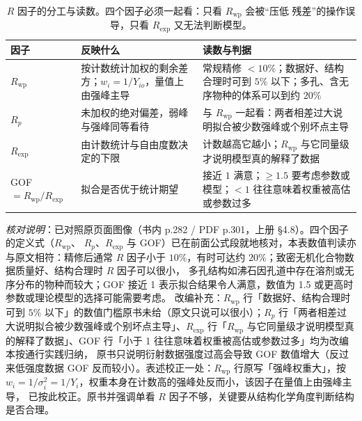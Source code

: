 \begin{table}[tbp]
  \centering
  \caption{$R$ 因子的分工与读数。四个因子必须一起看：只看 $R_{\mathrm{wp}}$ 会被``压低
    残差''的操作误导，只看 $R_{\mathrm{exp}}$ 又无法判断模型。}
  \label{tab:ch04c-rfactor}
  \begin{tabular}{@{}p{20mm}p{52mm}p{66mm}@{}}
    \toprule
    因子 & 反映什么 & 读数与判据 \\
    \midrule
    $R_{\mathrm{wp}}$ & 按计数统计加权的剩余差方；$w_{i}=1/Y_{io}$，量值上由强峰主导 &
    常规精修 $<10\%$；数据好、结构合理时可到 $5\%$ 以下；多孔、含无序物种的体系可以到约 $20\%$ \\
    $R_{p}$ & 未加权的绝对偏差，弱峰与强峰同等看待 &
    与 $R_{\mathrm{wp}}$ 一起看：两者相差过大说明拟合被少数强峰或个别坏点主导 \\
    $R_{\mathrm{exp}}$ & 由计数统计与自由度数决定的下限 &
    计数越高它越小；$R_{\mathrm{wp}}$ 与它同量级才说明模型真的解释了数据 \\
    GOF $=R_{\mathrm{wp}}/R_{\mathrm{exp}}$ & 拟合是否优于统计期望 &
    接近 $1$ 满意；$\ge1.5$ 要考虑参数或模型；$<1$ 往往意味着权重被高估或参数过多 \\
    \bottomrule
  \end{tabular}
\end{table}

\emph{核对说明}：已对照原页面图像（书内 p.282 / PDF p.301，上册 §4.8）。四个因子的定义式（$R_{\mathrm{wp}}$、
$R_p$、$R_{\mathrm{exp}}$ 与 GOF）已在前面公式段就地核对，本表数值判读亦与原文相符：精修后通常
$R$ 因子小于 $10\%$，有时可达约 $20\%$；致密无机化合物数据质量好、结构合理时 $R$ 因子可以很小，
多孔结构如沸石因孔道中存在溶剂或无序分布的物种而较大；GOF 接近 1 表示拟合结果令人满意，数值为 1.5 或更高时参数或理论模型的选择可能需要考虑。
改编补充：$R_{\mathrm{wp}}$ 行「数据好、结构合理时可到 $5\%$ 以下」的数值门槛原书未给（原文只说可以很小）；$R_p$ 行「两者相差过大说明拟合被少数强峰或个别坏点主导」、$R_{\mathrm{exp}}$ 行「$R_{\mathrm{wp}}$
与它同量级才说明模型真的解释了数据」、GOF 行「小于 1 往往意味着权重被高估或参数过多」均为改编本按通行实践归纳，
原书只说明衍射数据强度过高会导致 GOF 数值增大（反过来低强度数据 GOF 反而较小）。表述校正一处：$R_{\mathrm{wp}}$
行原写「强峰权重大」，按 $w_i=1/\sigma_i^2=1/Y_i$，权重本身在计数高的强峰处反而小，该因子在量值上由强峰主导，
已按此校正。原书并强调单看 $R$ 因子不够，关键要从结构化学角度判断结构是否合理。


